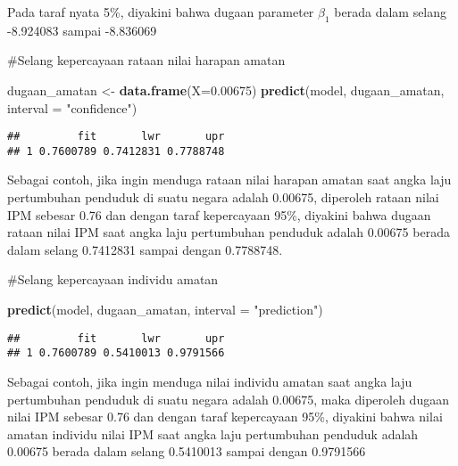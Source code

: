 \documentclass[
]{article}
\newenvironment{Shaded}{\begin{snugshade}}{\end{snugshade}}
\newcommand{\AttributeTok}[1]{\textcolor[rgb]{0.13,0.29,0.53}{#1}}
\newcommand{\FloatTok}[1]{\textcolor[rgb]{0.00,0.00,0.81}{#1}}
\newcommand{\FunctionTok}[1]{\textcolor[rgb]{0.13,0.29,0.53}{\textbf{#1}}}
\newcommand{\NormalTok}[1]{#1}
\newcommand{\OtherTok}[1]{\textcolor[rgb]{0.56,0.35,0.01}{#1}}
\newcommand{\StringTok}[1]{\textcolor[rgb]{0.31,0.60,0.02}{#1}}
\begin{document}
Pada taraf nyata 5\%, diyakini bahwa dugaan parameter \(\beta_1\) berada
dalam selang -8.924083 sampai -8.836069

\#Selang kepercayaan rataan nilai harapan amatan

\begin{Shaded}
\begin{Highlighting}[]
\NormalTok{dugaan\_amatan }\OtherTok{\textless{}{-}} \FunctionTok{data.frame}\NormalTok{(}\AttributeTok{X=}\FloatTok{0.00675}\NormalTok{)}
\FunctionTok{predict}\NormalTok{(model, dugaan\_amatan, }\AttributeTok{interval =} \StringTok{"confidence"}\NormalTok{)}
\end{Highlighting}
\end{Shaded}

\begin{verbatim}
##         fit       lwr       upr
## 1 0.7600789 0.7412831 0.7788748
\end{verbatim}

Sebagai contoh, jika ingin menduga rataan nilai harapan amatan saat
angka laju pertumbuhan penduduk di suatu negara adalah 0.00675,
diperoleh rataan nilai IPM sebesar 0.76 dan dengan taraf kepercayaan
95\%, diyakini bahwa dugaan rataan nilai IPM saat angka laju pertumbuhan
penduduk adalah 0.00675 berada dalam selang 0.7412831 sampai dengan
0.7788748.

\#Selang kepercayaan individu amatan

\begin{Shaded}
\begin{Highlighting}[]
\FunctionTok{predict}\NormalTok{(model, dugaan\_amatan, }\AttributeTok{interval =} \StringTok{"prediction"}\NormalTok{)}
\end{Highlighting}
\end{Shaded}

\begin{verbatim}
##         fit       lwr       upr
## 1 0.7600789 0.5410013 0.9791566
\end{verbatim}

Sebagai contoh, jika ingin menduga nilai individu amatan saat angka laju
pertumbuhan penduduk di suatu negara adalah 0.00675, maka diperoleh
dugaan nilai IPM sebesar 0.76 dan dengan taraf kepercayaan 95\%,
diyakini bahwa nilai amatan individu nilai IPM saat angka laju
pertumbuhan penduduk adalah 0.00675 berada dalam selang 0.5410013 sampai
dengan 0.9791566
\end{document}
